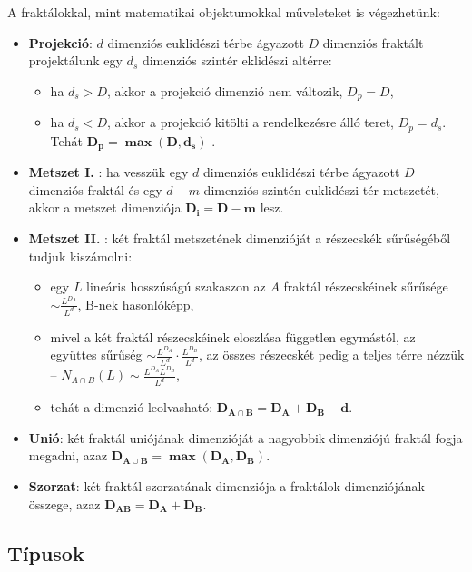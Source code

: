 \documentclass[12pt]{article}
\theoremstyle{plain}
\begin{document}
A fraktálokkal, mint matematikai objektumokkal műveleteket is végezhetünk:
\begin{itemize}
	\item \textbf{Projekció}: $d$ dimenziós euklidészi térbe ágyazott $D$ dimenziós fraktált projektálunk egy $d_s$ dimenziós szintér eklidészi altérre:
	\begin{itemize}
		\item ha $d_s>D$, akkor a projekció dimenzió nem változik, $D_p = D$,
		\item ha $d_s<D$, akkor a projekció kitölti a rendelkezésre álló teret, $D_p = d_s$. Tehát $\mathbf{D_p =\max \left(D, d_s\right) }$ .
	\end{itemize}  
	\item \textbf{Metszet I.} : ha vesszük egy $d$ dimenziós euklidészi térbe ágyazott $D$ dimenziós fraktál és egy $d-m$ dimenziós szintén euklidészi tér metszetét, akkor a metszet dimenziója $\mathbf{D_i = D-m}$ lesz.
	\item \textbf{Metszet II.} : két fraktál metszetének dimenzióját a részecskék sűrűségéből tudjuk kiszámolni:
	\begin{itemize}
		\item egy $L$ lineáris hosszúságú szakaszon az $A$ fraktál részecskéinek sűrűsége $\sim \frac{L^{D_A}}{L^d}$, B-nek hasonlóképp,
		\item mivel a két fraktál részecskéinek eloszlása független egymástól, az együttes sűrűség $\sim \frac{L^{D_A}}{L^d} \cdot \frac{L^{D_B}}{L^d}$, az összes részecskét pedig a teljes térre nézzük -- $N_{A \cap B} \left(L \right) \sim \frac{L^{D_A} L^{D_B}}{L^d}$,
		\item tehát a dimenzió leolvasható: $\mathbf{D_{A \cap B} = D_A + D_B - d}$.
	\end{itemize}
	\item \textbf{Unió}: két fraktál uniójának dimenzióját a nagyobbik dimenziójú fraktál fogja megadni, azaz $\mathbf{D_{A\cup B} = \max \left( D_A, D_B \right) }$.
	\item \textbf{Szorzat}: két fraktál szorzatának dimenziója a fraktálok dimenziójának összege, azaz $\mathbf{D_{AB} = D_A + D_B}$.

\end{itemize}

\subsection{Típusok}
\end{document}
